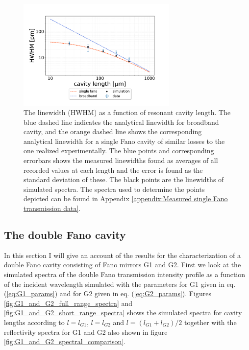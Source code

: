 \begin{figure}[h!]
    \centering
    \includegraphics[width=0.7\textwidth]{figures/results/HWHM_vs_cavity_length_single_fano.pdf}
    \caption{The linewidth (HWHM) as a function of resonant cavity length. The blue dashed line indicates the analytical linewidth for broadband cavity, and the orange dashed line shows the corresponding analytical linewidth for a single Fano cavity of similar losses to the one realized experimentally. The blue points and corresponding errorbars shows the measured linewidths found as averages of all recorded values at each length and the error is found as the standard deviation of these. The black points are the linewidths of simulated spectra. The spectra used to determine the points depicted can be found in Appendix \ref{appendix:Measured single Fano transmission data}.}
    \label{fig:HWHM_vs_length_single_fano_data}
\end{figure}

\clearpage
\subsection{The double Fano cavity}\label{sec:the_double_fano_cavity_results}

In this section I will give an account of the results for the characterization of a double Fano cavity consisting of Fano mirrors G1 and G2. First we look at the simulated spectra of the double Fano transmission intensity profile as a function of the incident wavelength simulated with the parameters for G1 given in eq. (\ref{eq:G1_params}) and for G2 given in eq. (\ref{eq:G2_params}). Figures \ref{fig:G1_and_G2_full_range_spectra} and \ref{fig:G1_and_G2_short_range_spectra} shows the simulated spectra for cavity lengths according to $l=l_{G1}$, $l=l_{G2}$ and $l=(l_{G1}+l_{G2})/2$ together with the reflectivity spectra for G1 and G2 also shown in figure \ref{fig:G1_and_G2_spectral_comparison}. 


